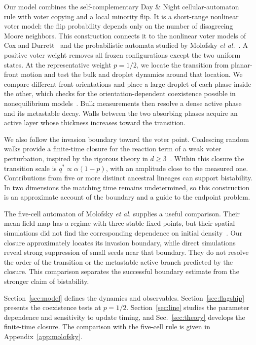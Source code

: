 \documentclass[pre,twocolumn,superscriptaddress,showpacs,floatfix]{revtex4-2}
\begin{document}
Our model combines the self-complementary Day \& Night cellular-automaton rule with voter
copying and a local minority flip. It is a short-range nonlinear voter model: the flip
probability depends only on the number of disagreeing Moore neighbors. This construction
connects it to the nonlinear voter models of Cox and Durrett~\cite{cox1991} and the
probabilistic automata studied by Molofsky \emph{et al.}~\cite{molofsky1999}. A positive voter
weight removes all frozen configurations except the two uniform states. At the
representative weight $p=1/2$, we locate the transition from planar-front motion and test
the bulk and droplet dynamics around that location. We compare different front
orientations and place a large droplet of each phase inside the other, which checks for
the orientation-dependent coexistence possible in nonequilibrium
models~\cite{wang2015,liu2018}. Bulk measurements then resolve a dense active phase and its
metastable decay. Walls between the two absorbing phases acquire an active layer whose
thickness increases toward the transition.

We also follow the invasion boundary toward the voter point. Coalescing random walks
provide a finite-time closure for the reaction term of a weak voter perturbation, inspired
by the rigorous theory in $d\ge3$~\cite{cox2013}. Within this closure the transition scale is
$q^*\propto\alpha(1-p)$, with an amplitude close to the measured one. Contributions from
five or more distinct ancestral lineages can support bistability. In two dimensions the
matching time remains undetermined, so this construction is an approximate account of the
boundary and a guide to the endpoint problem.

The five-cell automaton of Molofsky \emph{et al.} supplies a useful comparison. Their
mean-field map has a regime with three stable fixed points, but their spatial simulations
did not find the corresponding dependence on initial density~\cite{molofsky1999}.
Our closure approximately locates its invasion boundary, while direct simulations reveal
strong suppression of small seeds near that boundary. They do not resolve the order of
the transition or the metastable active branch predicted by the closure. This comparison
separates the successful boundary estimate from the stronger claim of bistability.

Section~\ref{sec:model} defines the dynamics and observables.
Section~\ref{sec:flagship} presents the coexistence tests at $p=1/2$.
Section~\ref{sec:line} studies the parameter dependence and sensitivity to update timing,
and Sec.~\ref{sec:theory} develops the finite-time closure.
The comparison with the five-cell rule is given in Appendix~\ref{app:molofsky}.
\end{document}

